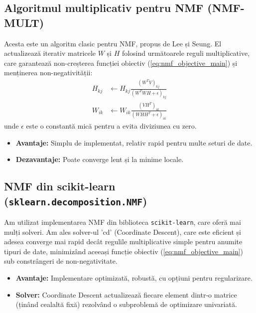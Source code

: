 \documentclass[12pt,a4paper]{article}
\begin{document}
\subsection{Algoritmul multiplicativ pentru NMF (NMF-MULT)}
Acesta este un algoritm clasic pentru NMF, propus de Lee și Seung. El actualizează iterativ matricele $W$ și $H$ folosind următoarele reguli multiplicative, care garantează non-creșterea funcției obiectiv (\ref{eq:nmf_objective_main}) și menținerea non-negativității:
\begin{align}
H_{kj} &\leftarrow H_{kj} \frac{(W^T V)_{kj}}{(W^T W H + \epsilon)_{kj}} \\
W_{ik} &\leftarrow W_{ik} \frac{(V H^T)_{ik}}{(W H H^T + \epsilon)_{ik}}
\end{align}
unde $\epsilon$ este o constantă mică pentru a evita diviziunea cu zero.
\begin{itemize}
\item \textbf{Avantaje:} Simplu de implementat, relativ rapid pentru multe seturi de date.
\item \textbf{Dezavantaje:} Poate converge lent și la minime locale.
\end{itemize}

\subsection{NMF din scikit-learn (\texttt{sklearn.decomposition.NMF})}
Am utilizat implementarea NMF din biblioteca \texttt{scikit-learn}, care oferă mai mulți solveri. Am ales solver-ul 'cd' (Coordinate Descent), care este eficient și adesea converge mai rapid decât regulile multiplicative simple pentru anumite tipuri de date, minimizând aceeași funcție obiectiv (\ref{eq:nmf_objective_main}) sub constrângeri de non-negativitate.
\begin{itemize}
\item \textbf{Avantaje:} Implementare optimizată, robustă, cu opțiuni pentru regularizare.
\item \textbf{Solver:} Coordinate Descent actualizează fiecare element dintr-o matrice (ținând cealaltă fixă) rezolvând o subproblemă de optimizare univariată.
\end{itemize}
\end{document}
